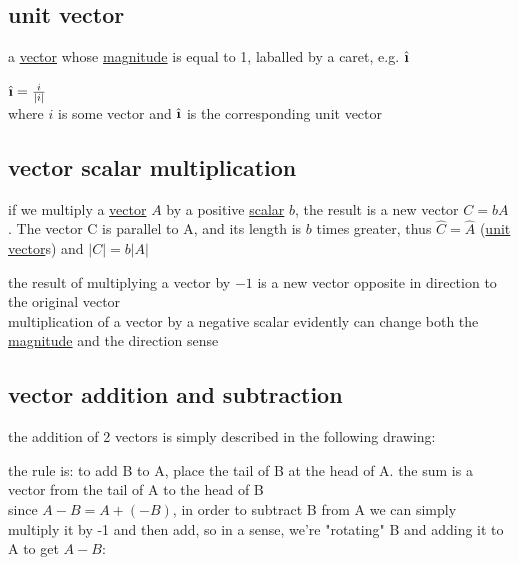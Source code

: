 \documentclass[a4paper,12pt]{article}
\newcommand{\ihat}{\hat{\textbf{\i}}}
\begin{document}
\subsection{unit vector}
\label{sec:orgc00677a}
\begin{definition}
a \hyperref[sec:org103a65e]{vector} whose \hyperref[sec:orgd47f5ea]{magnitude} is equal to 1, laballed by a caret, e.g. \(\ihat\)\\
\begin{lemma}
\(\ihat = \frac{i}{|i|}\)\\
where \(i\) is some vector and \(\ihat\) is the corresponding unit vector\\
\end{lemma}
\end{definition}
\subsection{vector scalar multiplication}
\label{sec:org099902f}
\begin{lemma}
if we multiply a \hyperref[sec:org103a65e]{vector} \(A\) by a positive \href{20220727110413-scalar.org}{scalar} \(b\), the result is a new vector \(C = bA\). The vector C is parallel to A, and its length is \(b\) times greater, thus \(\hat C = \hat A\) (\hyperref[sec:orgc00677a]{unit vector}s) and \(|C| = b|A|\)\\
\end{lemma}
\begin{lemma}
the result of multiplying a vector by \(-1\) is a new vector opposite in direction to the original vector\\
multiplication of a vector by a negative scalar evidently can change both the \hyperref[sec:orgd47f5ea]{magnitude} and the direction sense\\
\end{lemma}
\subsection{vector addition and subtraction}
\label{sec:org8a7b075}
the addition of 2 vectors is simply described in the following drawing:\\
\begin{center}

\end{center}

the rule is: to add B to A, place the tail of B at the head of A. the sum is a vector from the tail of A to the head of B\\
since \(A-B=A+(-B)\), in order to subtract B from A we can simply multiply it by -1 and then add, so in a sense, we're "rotating" B and adding it to A to get \(A-B\):\\
\begin{center}

\end{center}
\end{document}
